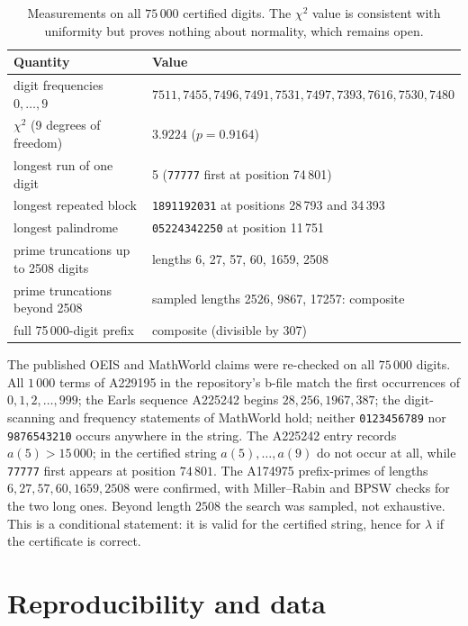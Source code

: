 \documentclass[11pt,a4paper]{article}
\theoremstyle{remark}
\newcommand{\lam}{\lambda}
\begin{document}
\begin{table}[ht]
\centering
\small
\begin{tabular}{@{}p{}p{}@{}}
\toprule
Quantity & Value \\
\midrule
digit frequencies $0,\ldots,9$ &
  $7511,7455,7496,7491,7531,7497,7393,7616,7530,7480$ \\
$\chi^2$ (9 degrees of freedom) & $3.9224$ ($p=0.9164$) \\
longest run of one digit & 5 (\texttt{77777} first at position 74\,801) \\
longest repeated block & \texttt{1891192031} at positions 28\,793 and 34\,393 \\
longest palindrome & \texttt{05224342250} at position 11\,751 \\
prime truncations up to 2508 digits & lengths 6, 27, 57, 60, 1659, 2508 \\
prime truncations beyond 2508 & sampled lengths 2526, 9867, 17257: composite \\
full 75\,000-digit prefix & composite (divisible by 307) \\
\bottomrule
\end{tabular}
\caption{Measurements on all $75\,000$ certified digits. The $\chi^2$
value is consistent with uniformity but proves nothing about normality,
which remains open.}
\label{tab:digits}
\end{table}

The published OEIS and MathWorld claims were re-checked on all $75\,000$
digits. All $1\,000$ terms of A229195 \cite{oeisA229195} in the
repository's b-file match the first occurrences of $0,1,2,\ldots,999$;
the Earls sequence A225242 \cite{oeisA225242} begins $28,256,1967,387$;
the digit-scanning and frequency statements of MathWorld hold; neither
\texttt{0123456789} nor \texttt{9876543210} occurs anywhere in the
string. The A225242 entry records $a(5)>15\,000$; in the certified string
$a(5),\ldots,a(9)$ do not occur at all, while \texttt{77777} first appears
at position $74\,801$. The A174975 prefix-primes of lengths
$6,27,57,60,1659,2508$ were confirmed, with Miller--Rabin and BPSW checks
for the two long ones. Beyond length $2508$ the search was sampled, not
exhaustive. This is a conditional statement: it is valid for the
certified string, hence for $\lam$ if the certificate is correct.

\section{Reproducibility and data}
\end{document}
